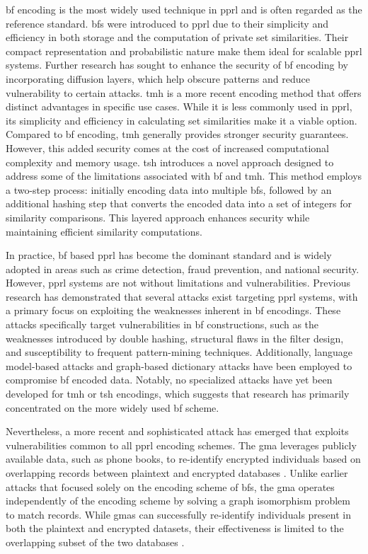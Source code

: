 \ac{bf} encoding is the most widely used technique in \ac{pprl} and is often regarded as the reference standard. 
\ac{bf}s were introduced to \ac{pprl} due to their simplicity and efficiency in both storage and the computation of private set similarities. 
Their compact representation and probabilistic nature make them ideal for scalable \ac{pprl} systems.
Further research has sought to enhance the security of \ac{bf} encoding by incorporating diffusion layers, which help obscure patterns and reduce vulnerability to certain attacks. %
\ac{tmh} is a more recent encoding method that offers distinct advantages in specific use cases. 
While it is less commonly used in \ac{pprl}, its simplicity and efficiency in calculating set similarities make it a viable option. 
Compared to \ac{bf} encoding, \ac{tmh} generally provides stronger security guarantees. 
However, this added security comes at the cost of increased computational complexity and memory usage.
\ac{tsh} introduces a novel approach designed to address some of the limitations associated with \ac{bf} and \ac{tmh}. 
This method employs a two-step process: initially encoding data into multiple \ac{bf}s, followed by an additional hashing step that converts the encoded data into a set of integers for similarity comparisons. 
This layered approach enhances security while maintaining efficient similarity computations. \cite{vidanage2020graph, schaefer2024}

In practice, \ac{bf} based \ac{pprl} has become the dominant standard and is widely adopted in areas such as crime detection, fraud prevention, and national security. 
However, \ac{pprl} systems are not without limitations and vulnerabilities. 
Previous research has demonstrated that several attacks exist targeting \ac{pprl} systems, with a primary focus on exploiting the weaknesses inherent in \ac{bf} encodings.
These attacks specifically target vulnerabilities in \ac{bf} constructions, such as the weaknesses introduced by double hashing, structural flaws in the filter design, and susceptibility to frequent pattern-mining techniques. 
Additionally, language model-based attacks and graph-based dictionary attacks have been employed to compromise \ac{bf} encoded data. 
Notably, no specialized attacks have yet been developed for \ac{tmh} or \ac{tsh} encodings, which suggests that research has primarily concentrated on the more widely used \ac{bf} scheme. \cite{vidanage2020graph}

Nevertheless, a more recent and sophisticated attack has emerged that exploits vulnerabilities common to all \ac{pprl} encoding schemes. 
The \ac{gma} leverages publicly available data, such as phone books, to re-identify encrypted individuals based on overlapping records between plaintext and encrypted databases \cite{vidanage2020graph, schaefer2024}. 
Unlike earlier attacks that focused solely on the encoding scheme of \ac{bf}s, the \ac{gma} operates independently of the encoding scheme by solving a graph isomorphism problem to match records. 
While \ac{gma}s can successfully re-identify individuals present in both the plaintext and encrypted datasets, their effectiveness is limited to the overlapping subset of the two databases \cite{schaefer2024}.

